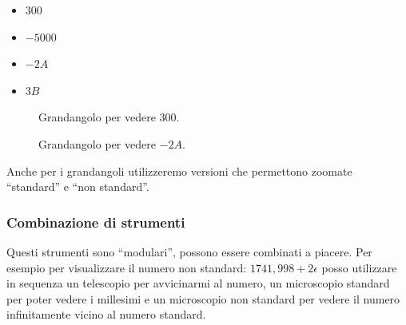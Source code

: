 \begin{multicols}{4}
\begin{itemize}[nosep]
 \item $300$
 \item $-5000$
 \item $-2A$
 \item $3B$
\end{itemize}
\end{multicols}
\vspace{-5mm}
\begin{figure}[h]
\begin{inaccessibleblock}

\begin{minipage}{.48\linewidth}
 \begin{center}
\scalebox{0.8}{\grandangoloa}
 \end{center}
\caption{Grandangolo per vedere \(300\).} \label{fig:grandangoloa}
\end{minipage}
\hfill
\begin{minipage}{.48\linewidth}
 \begin{center}
\scalebox{0.8}{\grandangolob}
 \end{center}
\caption{Grandangolo per vedere \(-2A\).} \label{fig:grandangolob}
\end{minipage}

\end{inaccessibleblock}
\end{figure}

Anche per i grandangoli utilizzeremo versioni che permettono zoomate 
``standard'' e ``non standard''.

\begin{inaccessibleblock}
\begin{minipage}{.38\linewidth}
\subsubsection{Combinazione di strumenti}
\label{subsec:insnum_combinazione}

Questi strumenti sono ``modulari'', possono essere combinati a piacere. 
Per esempio per visualizzare il numero non standard: 
\(1741,998 +2\epsilon\) posso utilizzare in sequenza un telescopio per 
avvicinarmi al numero, un microscopio standard per poter vedere i 
millesimi e un microscopio non standard per vedere il numero infinitamente 
vicino al numero standard.
\end{minipage}
\hfill
\begin{minipage}{.58\linewidth}
 \begin{center}
\scalebox{0.7}{\combinazione}
 \end{center}
\end{minipage}
\end{inaccessibleblock}

